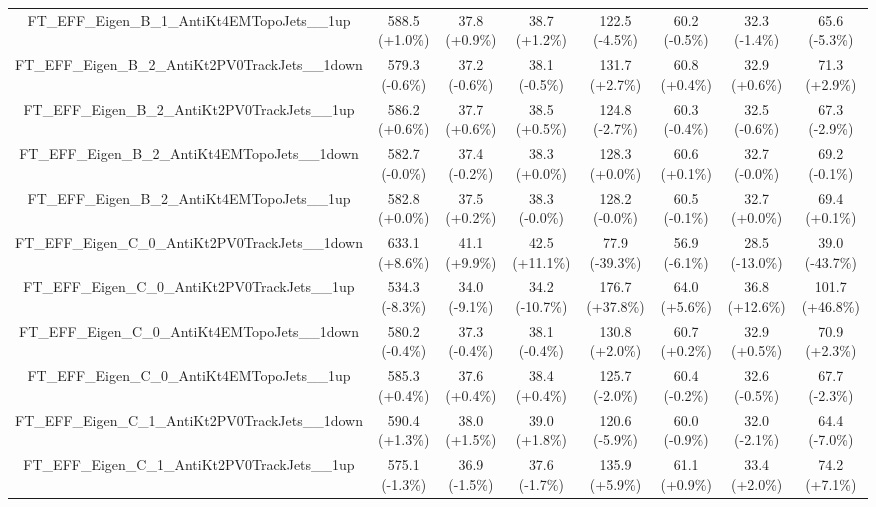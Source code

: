 \begin{table}[htbp!]
\begin{tiny}
\begin{center}
\begin{tabular}{c|c|c|c||c|c|c|c}
FT\_EFF\_Eigen\_B\_1\_AntiKt4EMTopoJets\_\_1up               & 588.5     (+1.0\%) & 37.8      (+0.9\%) & 38.7      (+1.2\%) & 122.5     (-4.5\%) & 60.2      (-0.5\%) & 32.3      (-1.4\%) & 65.6      (-5.3\%) \\ 
FT\_EFF\_Eigen\_B\_2\_AntiKt2PV0TrackJets\_\_1down           & 579.3     (-0.6\%) & 37.2      (-0.6\%) & 38.1      (-0.5\%) & 131.7     (+2.7\%) & 60.8      (+0.4\%) & 32.9      (+0.6\%) & 71.3      (+2.9\%) \\ 
FT\_EFF\_Eigen\_B\_2\_AntiKt2PV0TrackJets\_\_1up             & 586.2     (+0.6\%) & 37.7      (+0.6\%) & 38.5      (+0.5\%) & 124.8     (-2.7\%) & 60.3      (-0.4\%) & 32.5      (-0.6\%) & 67.3      (-2.9\%) \\ 
FT\_EFF\_Eigen\_B\_2\_AntiKt4EMTopoJets\_\_1down             & 582.7     (-0.0\%) & 37.4      (-0.2\%) & 38.3      (+0.0\%) & 128.3     (+0.0\%) & 60.6      (+0.1\%) & 32.7      (-0.0\%) & 69.2      (-0.1\%) \\ 
FT\_EFF\_Eigen\_B\_2\_AntiKt4EMTopoJets\_\_1up               & 582.8     (+0.0\%) & 37.5      (+0.2\%) & 38.3      (-0.0\%) & 128.2     (-0.0\%) & 60.5      (-0.1\%) & 32.7      (+0.0\%) & 69.4      (+0.1\%) \\ 
FT\_EFF\_Eigen\_C\_0\_AntiKt2PV0TrackJets\_\_1down           & 633.1     (+8.6\%) & 41.1      (+9.9\%) & 42.5      (+11.1\%) & 77.9      (-39.3\%) & 56.9      (-6.1\%) & 28.5      (-13.0\%) & 39.0      (-43.7\%) \\ 
FT\_EFF\_Eigen\_C\_0\_AntiKt2PV0TrackJets\_\_1up             & 534.3     (-8.3\%) & 34.0      (-9.1\%) & 34.2      (-10.7\%) & 176.7     (+37.8\%) & 64.0      (+5.6\%) & 36.8      (+12.6\%) & 101.7     (+46.8\%) \\ 
FT\_EFF\_Eigen\_C\_0\_AntiKt4EMTopoJets\_\_1down             & 580.2     (-0.4\%) & 37.3      (-0.4\%) & 38.1      (-0.4\%) & 130.8     (+2.0\%) & 60.7      (+0.2\%) & 32.9      (+0.5\%) & 70.9      (+2.3\%) \\ 
FT\_EFF\_Eigen\_C\_0\_AntiKt4EMTopoJets\_\_1up               & 585.3     (+0.4\%) & 37.6      (+0.4\%) & 38.4      (+0.4\%) & 125.7     (-2.0\%) & 60.4      (-0.2\%) & 32.6      (-0.5\%) & 67.7      (-2.3\%) \\ 
FT\_EFF\_Eigen\_C\_1\_AntiKt2PV0TrackJets\_\_1down           & 590.4     (+1.3\%) & 38.0      (+1.5\%) & 39.0      (+1.8\%) & 120.6     (-5.9\%) & 60.0      (-0.9\%) & 32.0      (-2.1\%) & 64.4      (-7.0\%) \\ 
FT\_EFF\_Eigen\_C\_1\_AntiKt2PV0TrackJets\_\_1up             & 575.1     (-1.3\%) & 36.9      (-1.5\%) & 37.6      (-1.7\%) & 135.9     (+5.9\%) & 61.1      (+0.9\%) & 33.4      (+2.0\%) & 74.2      (+7.1\%) \\ 

\end{tabular}
\end{center}
\end{tiny}
\end{table}
